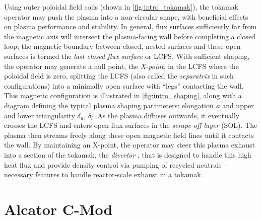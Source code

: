 Using outer poloidal field coils (shown in \cref{fig:intro_tokamak}), the tokamak operator may push the plasma into a non-circular shape, with beneficial effects on plasma performance and stability.  In general, flux surfaces sufficiently far from the magnetic axis will intersect the plasma-facing wall before completing a closed loop; the magnetic boundary between closed, nested surfaces and these open surfaces is termed the \emph{last closed flux surface} or LCFS.  With sufficient shaping, the operator may generate a null point, the \emph{X-point}, in the LCFS where the poloidal field is zero, splitting the LCFS (also called the \emph{separatrix} in such configurations) into a minimally open surface with ``legs'' contacting the wall.  This magnetic configuration is illustrated in \cref{fig:intro_shaping}, along with a diagram defining the typical plasma shaping parameters: elongation $\kappa$ and upper and lower triangularity $\delta_u$, $\delta_l$.  As the plasma diffuses outwards, it eventually crosses the LCFS and enters 
open flux surfaces in the \emph{scrape-off layer} (SOL).  The plasma then streams freely along these open magnetic field lines until it contacts the wall.  By maintaining an X-point, the operator may steer this plasma exhaust into a section of the tokamak, the \emph{divertor} \cite{Lipschultz2007,Lipschultz2007a,Titus2009}, that is designed to handle this high heat flux and provide density control via pumping of recycled neutrals -- necessary features to handle reactor-scale exhaust in a tokamak.\nicesectionending


\section{Alcator C-Mod}\label{sec:intro_cmod}

